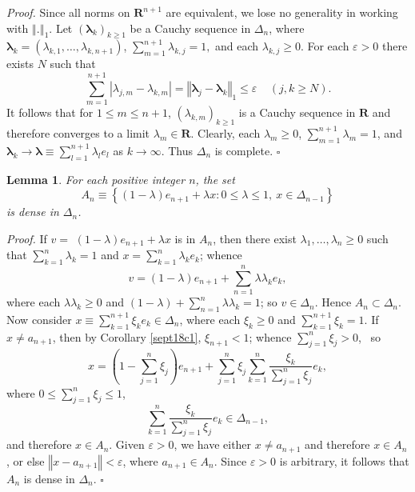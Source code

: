 \documentclass[11pt]{article}%
\newtheorem{lemma}[theorem]{Lemma}
\newenvironment{proof}[1][Proof]{\noindent\textit{#1.} }{}
\begin{document}
\begin{proof}
Since all norms on $\mathbf{R}^{n+1}$ are equivalent, we lose no generality in
working with $\left\Vert .\right\Vert _{1}$. Let $\left(  \mathbf{\lambda}%
_{k}\right)  _{k\geq1}$ be a Cauchy sequence in $\Delta_{n}$, where
$\mathbf{\lambda}_{k}=\left(  \lambda_{k,1},\ldots,\lambda_{k,n+1}\right)  $,
$\sum_{m=1}^{n+1}\lambda_{k,j}=1,$ and each $\lambda_{k,j}\geq0$. For each
$\varepsilon>0$ there exists $N$ such that%
\[
\sum_{m=1}^{n+1}\left\vert \lambda_{j,m}-\lambda_{k,m}\right\vert =\left\Vert
\mathbf{\lambda}_{j}-\mathbf{\lambda}_{k}\right\Vert _{1}\leq\varepsilon
\ \ \ \ \ \left(  j,k\geq N\right)  .
\]
It follows that for $1\leq m\leq n+1$, $\left(  \lambda_{k,m}\right)
_{k\geq1}$ is a Cauchy sequence in $\mathbf{R}$ and therefore converges to a
limit $\lambda_{m}\in\mathbf{R}$. Clearly, each $\lambda_{m}\geq0$,
$\sum_{m=1}^{n+1}\lambda_{m}=1$, and $\mathbf{\lambda}_{k}\rightarrow
\mathbf{\lambda}\equiv\sum_{l=1}^{n+1}\lambda_{l}e_{l}$ as $k\rightarrow
\infty$. Thus $\Delta_{n}$ is complete.%
\hfill
$\square$
\end{proof}

\begin{lemma}
\label{jul07l2}For each positive integer $n$, the set
\[
A_{n}\equiv\left\{  (1-\lambda)e_{n+1}+\lambda x:0\leq\lambda\leq
1,\ x\in\Delta_{n-1}\right\}
\]
is dense in $\Delta_{n}$.
\end{lemma}

\begin{proof}
If $v=$ $(1-\lambda)e_{n+1}+\lambda x$ is in $A_{n}$, then there exist
$\lambda_{1},\ldots,\lambda_{n}\geq0$ such that $\sum_{k=1}^{n}\lambda_{k}=1$
and $x=\sum_{k=1}^{n}\lambda_{k}e_{k}$; whence%
\[
v=\left(  1-\lambda\right)  e_{n+1}+\sum_{n=1}^{n}\lambda\lambda_{k}e_{k},
\]
where each $\lambda\lambda_{k}\geq0$ and $\left(  1-\lambda\right)
+\sum_{n=1}^{n}\lambda\lambda_{k}=1$; so $v\in\Delta_{n}$. Hence $A_{n}%
\subset\Delta_{n}$. Now consider $x\equiv\sum_{k=1}^{n+1}\xi_{k}e_{k}\in
\Delta_{n}$, where each $\xi_{k}\geq0$ and $\sum_{k=1}^{n+1}\xi_{k}=1$. If
$x\neq a_{n+1}$, then by Corollary \ref{sept18c1}, $\xi_{n+1}<1$; whence
$\sum_{j=1}^{n}\xi_{j}>0$, \ so
\[
x=\left(  1-\sum_{j=1}^{n}\xi_{j}\right)  e_{n+1}+\sum_{j=1}^{n}\xi_{j}%
\sum_{k=1}^{n}\frac{\xi_{k}}{\sum_{j=1}^{n}\xi_{j}}e_{k},
\]
where $0\leq\sum_{j=1}^{n}\xi_{j}\leq1$,%
\[
\sum_{k=1}^{n}\frac{\xi_{k}}{\sum_{j=1}^{n}\xi_{j}}e_{k}\in\Delta_{n-1},
\]
and therefore $x\in A_{n}$. Given $\varepsilon>0$, we have either $x\neq
a_{n+1}$ and therefore $x\in A_{n}$, or else $\left\Vert x-a_{n+1}\right\Vert
<\varepsilon$, where $a_{n+1}\in A_{n}$. Since $\varepsilon>0$ is arbitrary,
it follows that $A_{n}$ is dense in $\Delta_{n}$.%
\hfill
$\square$
\end{proof}
\end{document}
